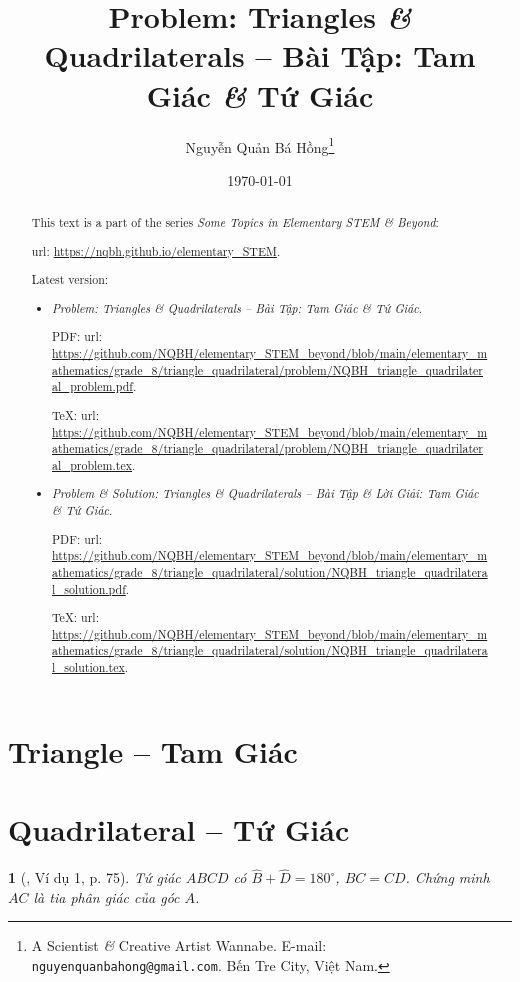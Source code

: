 \documentclass{article}
\title{Problem: Triangles {\it\&} Quadrilaterals -- Bài Tập: Tam Giác {\it\&} Tứ Giác}
\author{Nguyễn Quản Bá Hồng\footnote{A Scientist {\it\&} Creative Artist Wannabe. E-mail: {\tt nguyenquanbahong@gmail.com}. Bến Tre City, Việt Nam.}}
\date{\today}
\newtheorem{baitoan}{}
\begin{document}
\maketitle
\begin{abstract}
	This text is a part of the series {\it Some Topics in Elementary STEM \& Beyond}:
	
	{\sc url}: \url{https://nqbh.github.io/elementary_STEM}.
	
	Latest version:
	\begin{itemize}
		\item {\it Problem: Triangles \& Quadrilaterals -- Bài Tập: Tam Giác \& Tứ Giác}.
		
		PDF: {\sc url}: \url{https://github.com/NQBH/elementary_STEM_beyond/blob/main/elementary_mathematics/grade_8/triangle_quadrilateral/problem/NQBH_triangle_quadrilateral_problem.pdf}.
		
		\TeX: {\sc url}: \url{https://github.com/NQBH/elementary_STEM_beyond/blob/main/elementary_mathematics/grade_8/triangle_quadrilateral/problem/NQBH_triangle_quadrilateral_problem.tex}.
		\item {\it Problem \& Solution: Triangles \& Quadrilaterals -- Bài Tập \& Lời Giải: Tam Giác \& Tứ Giác}.
		
		PDF: {\sc url}: \url{https://github.com/NQBH/elementary_STEM_beyond/blob/main/elementary_mathematics/grade_8/triangle_quadrilateral/solution/NQBH_triangle_quadrilateral_solution.pdf}.
		
		\TeX: {\sc url}: \url{https://github.com/NQBH/elementary_STEM_beyond/blob/main/elementary_mathematics/grade_8/triangle_quadrilateral/solution/NQBH_triangle_quadrilateral_solution.tex}.
	\end{itemize}
\end{abstract}
\tableofcontents


\section{Triangle -- Tam Giác}

\section{Quadrilateral -- Tứ Giác}

\begin{baitoan}[\cite{Binh_Toan_8_tap_1}, Ví dụ 1, p. 75]
	Tứ giác $ABCD$ có $\widehat{B} + \widehat{D} = 180^\circ$, $BC = CD$. Chứng minh $AC$ là tia phân giác của góc $A$.
\end{baitoan}
\end{document}
